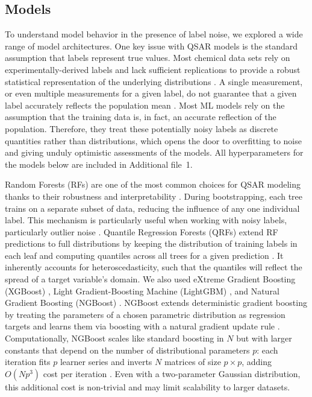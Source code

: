 \documentclass[pdflatex,sn-basic]{sn-jnl}%
\theoremstyle{thmstyleone}%
\theoremstyle{thmstyletwo}%
\theoremstyle{thmstylethree}%
\begin{document}
\subsection{Models}
To understand model behavior in the presence of label noise, we explored a wide range of model architectures. One key issue with QSAR models is the standard assumption that labels represent true values. Most chemical data sets rely on experimentally-derived labels and lack sufficient replications to provide a robust statistical representation of the underlying distributions \citep{Kolmar2021}. A single measurement, or even multiple measurements for a given label, do not guarantee that a given label accurately reflects the population mean \citep{Kolmar2021}. Most ML models rely on the assumption that the training data is, in fact, an accurate reflection of the population. Therefore, they treat these potentially noisy labels as discrete quantities rather than distributions, which opens the door to overfitting to noise and giving unduly optimistic assessments of the models. All hyperparameters for the models below are included in Additional file~1.

Random Forests (RFs) are one of the most common choices for QSAR modeling thanks to their robustness and interpretability \citep{Svetnik2003}. During bootstrapping, each tree trains on a separate subset of data, reducing the influence of any one individual label. This mechanism is particularly useful when working with noisy labels, particularly outlier noise \citep{Breiman2001}. Quantile Regression Forests (QRFs) extend RF predictions to full distributions by keeping the distribution of training labels in each leaf and computing quantiles across all trees for a given prediction \citep{Meinshausen2006}. It inherently accounts for heteroscedasticity, such that the quantiles will reflect the spread of a target variable's domain. We also used eXtreme Gradient Boosting (XGBoost) \citep{Mustapha2016, Tian2022}, Light Gradient-Boosting Machine (LightGBM) \citep{ke2017lightgbm}, and Natural Gradient Boosting (NGBoost) \citep{Duan2020}. NGBoost extends deterministic gradient boosting by treating the parameters of a chosen parametric distribution as regression targets and learns them via boosting with a natural gradient update rule \citep{Duan2020}. Computationally, NGBoost scales like standard boosting in $N$ but with larger constants that depend on the number of distributional parameters $p$: each iteration fits $p$ learner series and inverts $N$ matrices of size $p \times p$, adding $O(Np^3)$ cost per iteration \citep{Duan2020}. Even with a two-parameter Gaussian distribution, this additional cost is non-trivial and may limit scalability to larger datasets.
\end{document}

